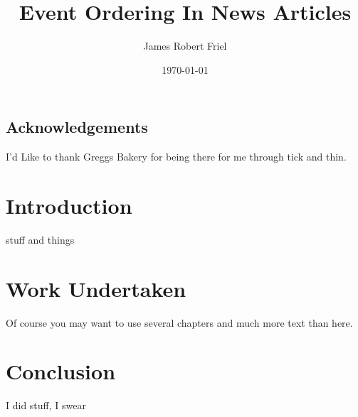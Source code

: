 \documentclass[bsc,frontabs,twoside,singlespacing,parskip,deptreport]{infthesis}     %
\begin{document}
\title{Event Ordering In News Articles}

\author{James Robert Friel}



\date{\today}

\abstract{
}

\maketitle

\section*{Acknowledgements}
I'd Like to thank Greggs Bakery for being there for me through tick and thin.

\tableofcontents



\chapter{Introduction}
stuff and things

\chapter{Work Undertaken}

Of course
you may want to use several chapters and much more text than here.



\chapter{Conclusion}
I did stuff, I swear
\cite{name}
\cite{name2}


\end{document}
